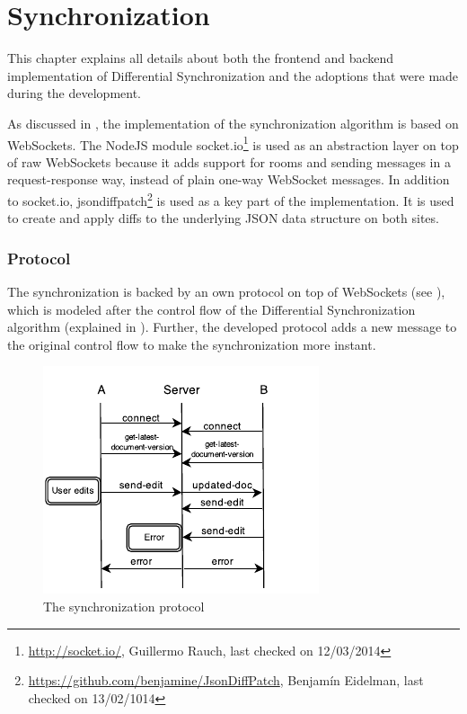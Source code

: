 \chapter{Synchronization}
\label{impl-sync-algorithm}
This chapter explains all details about both the frontend and backend implementation of  Differential Synchronization and the adoptions that were made during the development. 

As discussed in , the implementation of the synchronization algorithm is based on WebSockets. The NodeJS module socket.io\footnote{\url{http://socket.io/}, Guillermo Rauch, last checked on 12/03/2014} is used as an abstraction layer on top of raw WebSockets because it adds support for rooms and sending messages in a request-response way, instead of plain one-way WebSocket messages. In addition to socket.io, jsondiffpatch\footnote{\url{https://github.com/benjamine/JsonDiffPatch}, Benjam\'{i}n Eidelman, last checked on 13/02/1014} is used as a key part of the implementation. It is used to create and apply diffs to the underlying JSON data structure on both sites.

\subsection{Protocol}
\label{subsec:ds-algo-protocol}

The synchronization is backed by an own protocol on top of WebSockets (see ), which is modeled after the control flow of the Differential Synchronization algorithm (explained in ). Further, the developed protocol adds a new message to the original control flow to make the synchronization more instant.

\begin{figure}[htb]
  \centerline{\includegraphics[width=0.8\linewidth]{images/ds-protocol.pdf}}
  \caption[The synchronization protocol]{The synchronization protocol}
  \label{fig:ds-protocol}
\end{figure}

